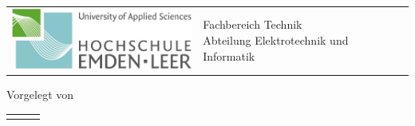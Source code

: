 
\begin{titlepage}

	\hspace{-1.0cm}
	\begin{tabular}{p{8.0cm} p{8.0cm}}
		\includegraphics[width = 6.0cm]{03_Ressourcen/Logo/Technik.png} & %
		\parbox[b]{8.0cm}{
		{\large  Fachbereich Technik }                                    \\ %
		{\large  Abteilung Elektrotechnik und Informatik } %
		}                                                                 \\
		\\
		\hline
	\end{tabular}
	\begin{center}

		\vspace{2.5cm}
		\LARGE{\textsc{\praktikumstitel}}
		\ifx\semester\empty\else\LARGE{\textsc{\semester}}\fi

		\vspace{2cm}%
		\ifx\versuchsnummer\empty\else\LARGE{\textsc{\versuchsnummer}}\fi
		\LARGE{\versuchstitel}

		\vspace{2cm}%
		\large

		\ifx\gruppe\empty\else\gruppe\fi
		\studiengang
		\vspace{0.5cm}

		Vorgelegt von\\

		\begin{table}[!ht]
			\centering
			\begin{tabular}{rll}
				\vornameStudZwei & \nachnameStudZwei & \matrikelnummerStudZwei %
			\end{tabular}
		\end{table}



\end{center}
\end{titlepage}

